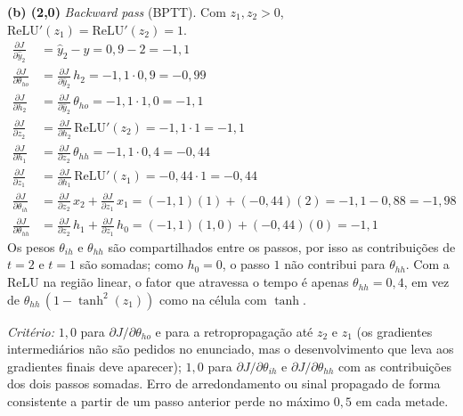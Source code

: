 \documentclass[11pt,a4paper]{article}
\begin{document}
\textbf{(b) (2{,}0)} \textit{Backward pass} (BPTT). Com $z_1, z_2 > 0$, $\mathrm{ReLU}'(z_1) = \mathrm{ReLU}'(z_2) = 1$.
\begin{align*}
    \frac{\partial J}{\partial \hat{y}_2} &= \hat{y}_2 - y = 0{,}9 - 2 = -1{,}1 \\
    \frac{\partial J}{\partial \theta_{ho}} &= \frac{\partial J}{\partial \hat{y}_2}\, h_2 = -1{,}1 \cdot 0{,}9 = -0{,}99 \\
    \frac{\partial J}{\partial h_2} &= \frac{\partial J}{\partial \hat{y}_2}\, \theta_{ho} = -1{,}1 \cdot 1{,}0 = -1{,}1 \\
    \frac{\partial J}{\partial z_2} &= \frac{\partial J}{\partial h_2}\, \mathrm{ReLU}'(z_2) = -1{,}1 \cdot 1 = -1{,}1 \\
    \frac{\partial J}{\partial h_1} &= \frac{\partial J}{\partial z_2}\, \theta_{hh} = -1{,}1 \cdot 0{,}4 = -0{,}44 \\
    \frac{\partial J}{\partial z_1} &= \frac{\partial J}{\partial h_1}\, \mathrm{ReLU}'(z_1) = -0{,}44 \cdot 1 = -0{,}44 \\[0.3em]
    \frac{\partial J}{\partial \theta_{ih}} &= \frac{\partial J}{\partial z_2}\, x_2 + \frac{\partial J}{\partial z_1}\, x_1 = (-1{,}1)(1) + (-0{,}44)(2) = -1{,}1 - 0{,}88 = -1{,}98 \\
    \frac{\partial J}{\partial \theta_{hh}} &= \frac{\partial J}{\partial z_2}\, h_1 + \frac{\partial J}{\partial z_1}\, h_0 = (-1{,}1)(1{,}0) + (-0{,}44)(0) = -1{,}1
\end{align*}
Os pesos $\theta_{ih}$ e $\theta_{hh}$ são compartilhados entre os passos, por isso as contribuições de $t = 2$ e $t = 1$ são somadas; como $h_0 = 0$, o passo $1$ não contribui para $\theta_{hh}$. Com a ReLU na região linear, o fator que atravessa o tempo é apenas $\theta_{hh} = 0{,}4$, em vez de $\theta_{hh}\,(1 - \tanh^2(z_1))$ como na célula com $\tanh$.

\textit{Critério:} $1{,}0$ para $\partial J / \partial \theta_{ho}$ e para a retropropagação até $z_2$ e $z_1$ (os gradientes intermediários não são pedidos no enunciado, mas o desenvolvimento que leva aos gradientes finais deve aparecer); $1{,}0$ para $\partial J / \partial \theta_{ih}$ e $\partial J / \partial \theta_{hh}$ com as contribuições dos dois passos somadas. Erro de arredondamento ou sinal propagado de forma consistente a partir de um passo anterior perde no máximo $0{,}5$ em cada metade.

\color{black}
\end{document}
